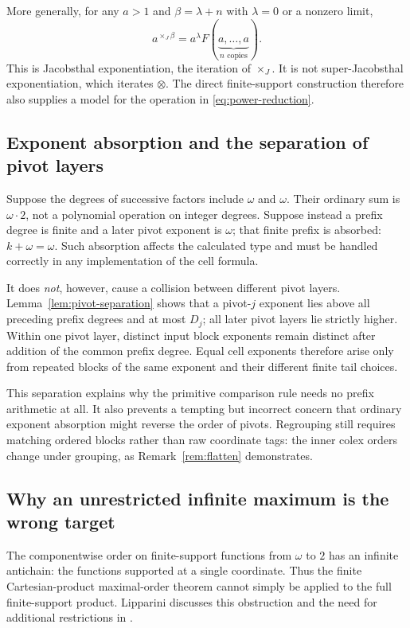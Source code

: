 \documentclass[11pt,letterpaper]{article}
\theoremstyle{definition}
\theoremstyle{remark}
\newcommand{\J}{\mathbin{\times_{\!J}}}
\begin{document}
More generally, for any $a>1$ and $\beta=\lambda+n$ with $\lambda=0$
or a nonzero limit,
\begin{equation}\label{eq:power-reduction}
 a^{\J\beta}=a^\lambda
       F(\underbrace{a,\ldots,a}_{n\text{ copies}}).
\end{equation}
This is Jacobsthal exponentiation, the iteration of $\J$. It is not
super-Jacobsthal exponentiation, which iterates $\otimes$.
The direct finite-support construction therefore also supplies a model
for the operation in \eqref{eq:power-reduction}.

\subsection{Exponent absorption and the separation of pivot layers}

Suppose the degrees of successive factors include $\omega$ and $\omega$.
Their ordinary sum is $\omega\cdot2$, not a polynomial operation on
integer degrees. Suppose instead a prefix degree is finite and a later
pivot exponent is $\omega$; that finite prefix is absorbed:
$k+\omega=\omega$. Such absorption affects the calculated type and must
be handled correctly in any implementation of the cell formula.

It does \emph{not}, however, cause a collision between different pivot
layers. Lemma~\ref{lem:pivot-separation} shows that a pivot-$j$ exponent
lies above all preceding prefix degrees and at most $D_j$; all later
pivot layers lie strictly higher. Within one pivot layer, distinct input
block exponents remain distinct after addition of the common prefix
degree. Equal cell exponents therefore arise only from repeated blocks
of the same exponent and their different finite tail choices.

This separation explains why the primitive comparison rule needs no
prefix arithmetic at all. It also prevents a tempting but incorrect
concern that ordinary exponent absorption might reverse the order of
pivots. Regrouping still requires matching ordered blocks rather than
raw coordinate tags: the inner colex orders change under grouping, as
Remark~\ref{rem:flatten} demonstrates.

\subsection{Why an unrestricted infinite maximum is the wrong target}

The componentwise order on finite-support functions from $\omega$ to
$2$ has an infinite antichain: the functions supported at a single
coordinate. Thus the finite Cartesian-product maximal-order theorem
cannot simply be applied to the full finite-support product. Lipparini
discusses this obstruction and the need for additional restrictions in
\cite[Section~3.4]{lip-product}.
\end{document}

